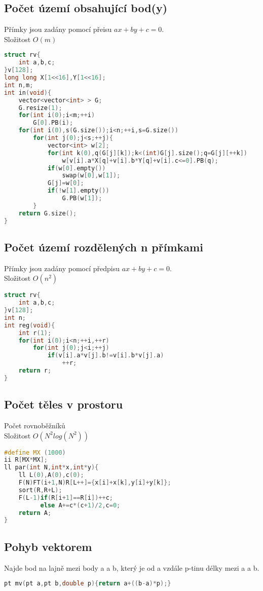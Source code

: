 \documentclass[11pt]{article}
\begin{document}
\subsection{Počet území obsahující bod(y)}
Přímky jsou zadány pomocí přeisu $ax+by+c=0$.
\\Složitost $O(m)$
\begin{lstlisting}[language=C++]
struct rv{
    int a,b,c;
}v[128];
long long X[1<<16],Y[1<<16];
int n,m;
int in(void){
    vector<vector<int> > G;
    G.resize(1);
    for(int i(0);i<m;++i)
        G[0].PB(i);
    for(int i(0),s(G.size());i<n;++i,s=G.size())
        for(int j(0);j<s;++j){
            vector<int> w[2];
            for(int k(0),q(G[j][k]);k<(int)G[j].size();q=G[j][++k])
                w[v[i].a*X[q]+v[i].b*Y[q]+v[i].c<=0].PB(q);
            if(w[0].empty())
                swap(w[0],w[1]);
            G[j]=w[0];
            if(!w[1].empty())
                G.PB(w[1]);
        }
    return G.size();
}
\end{lstlisting}
\subsection{Počet území rozdělených n přímkami}
Přímky jsou zadány pomocí předpisu $ax+by+c=0$.
\\Složitost $O(n^2)$
\begin{lstlisting}[language=C++]
struct rv{
    int a,b,c;
}v[128];
int n;
int reg(void){
    int r(1);
    for(int i(0);i<n;++i,++r)
        for(int j(0);j<i;++j)
            if(v[i].a*v[j].b!=v[i].b*v[j].a)
                ++r;
    return r;
}
\end{lstlisting}
\subsection{Počet těles v prostoru}
Počet rovnoběžníků
\\Složitost $O(N^2log(N^2))$
\begin{lstlisting}[language=C++]
#define MX (1000)
ii R[MX*MX];
ll par(int N,int*x,int*y){
    ll L(0),A(0),c(0);
    F(N)FT(i+1,N)R[L++]={x[i]+x[k],y[i]+y[k]};
    sort(R,R+L);
    F(L-1)if(R[i+1]==R[i])++c;
          else A+=c*(c+1)/2,c=0;
    return A;
}
\end{lstlisting}
\subsection{Pohyb vektorem}
Najde bod na lajně mezi body \textsf{a} a \textsf{b}, který je od \textsf{a} vzdále \textsf{p}-tinu délky mezi \textsf{a} a \textsf{b}.
\begin{lstlisting}[language=C++]
pt mv(pt a,pt b,double p){return a+((b-a)*p);}
\end{lstlisting}
\end{document}
